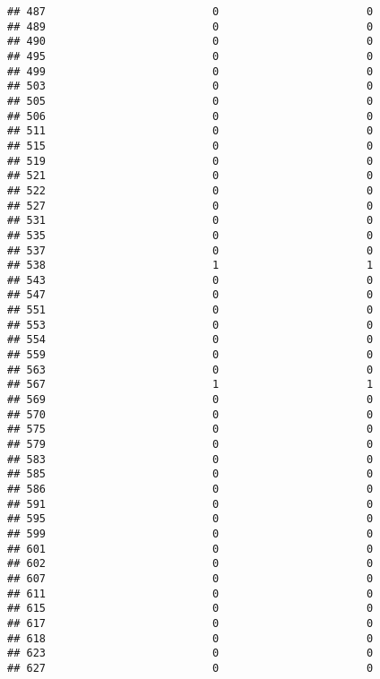 \documentclass[
]{article}
\begin{document}
\begin{verbatim}
## 487                          0                       0
## 489                          0                       0
## 490                          0                       0
## 495                          0                       0
## 499                          0                       0
## 503                          0                       0
## 505                          0                       0
## 506                          0                       0
## 511                          0                       0
## 515                          0                       0
## 519                          0                       0
## 521                          0                       0
## 522                          0                       0
## 527                          0                       0
## 531                          0                       0
## 535                          0                       0
## 537                          0                       0
## 538                          1                       1
## 543                          0                       0
## 547                          0                       0
## 551                          0                       0
## 553                          0                       0
## 554                          0                       0
## 559                          0                       0
## 563                          0                       0
## 567                          1                       1
## 569                          0                       0
## 570                          0                       0
## 575                          0                       0
## 579                          0                       0
## 583                          0                       0
## 585                          0                       0
## 586                          0                       0
## 591                          0                       0
## 595                          0                       0
## 599                          0                       0
## 601                          0                       0
## 602                          0                       0
## 607                          0                       0
## 611                          0                       0
## 615                          0                       0
## 617                          0                       0
## 618                          0                       0
## 623                          0                       0
## 627                          0                       0

\end{verbatim}
\end{document}
